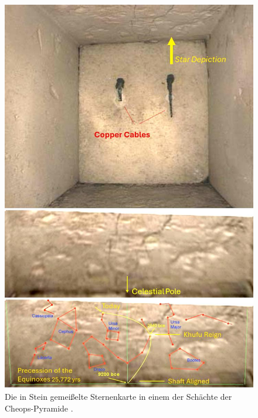 \documentclass[10pt,twocolumn,letterpaper]{article}
\begin{document}
\begin{figure}[H]
\begin{center}
\includegraphics[width=1\linewidth]{star-stone.jpg}
\end{center}
   \caption{Die in Stein gemeißelte Sternenkarte in einem der Schächte der Cheops-Pyramide \cite{28}.}
\label{fig:20}
\label{fig:onecol}
\end{figure}
\end{document}
